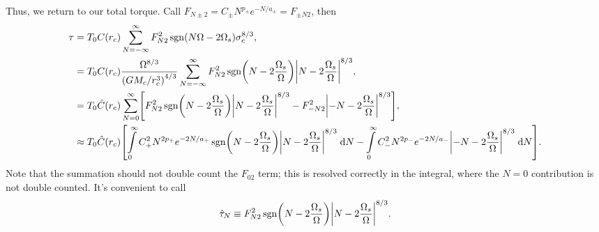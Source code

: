 \documentclass[11pt,
        usenames, %
        dvipsnames %
    ]{article}
\DeclareMathOperator{\sgn}{sgn}
\DeclarePairedDelimiter\abs{\lvert}{\rvert}
\DeclarePairedDelimiter\p{\lparen}{\rparen}
\DeclarePairedDelimiter\s{\lbrack}{\rbrack}
\begin{document}
Thus, we return to our total torque. Call $F_{N \pm 2} = C_{\pm}N^{p_{\pm}}
e^{-N/a_{\pm}} = F_{\pm N 2}$, then
\begin{align}
    \tau &= T_0 C(r_c) \sum\limits_{N = -\infty}^\infty
            F_{N2}^2 \sgn\p*{N\Omega - 2\Omega_s}
                \sigma_c^{8/3},\\
        &= T_0 C(r_c) \frac{\Omega^{8/3}}{\p*{GM_c/r_c^3}^{4/3}}
            \sum\limits_{N = -\infty}^\infty
                F_{N2}^2 \sgn\p*{N - 2\frac{\Omega_s}{\Omega}}
                    \abs*{N - 2\frac{\Omega_s}{\Omega}}^{8/3},\\
        &= T_0 \hat{C}(r_c) \sum\limits_{N = 0}^\infty
            \s*{F_{N2}^2 \sgn\p*{N - 2\frac{\Omega_s}{\Omega}}
                \abs*{N - 2\frac{\Omega_s}{\Omega}}^{8/3} -
                F_{-N2}^2 \abs*{-N - 2\frac{\Omega_s}{\Omega}}^{8/3}},\\
        &\approx T_0\hat{C}(r_c)\s*{
            \int\limits_0^\infty C_+^2N^{2p_{+}} e^{-2N / a_{+}}
                \sgn\p*{N - 2\frac{\Omega_s}{\Omega}}
                \abs*{N - 2\frac{\Omega_s}{\Omega}}^{8/3}\;\mathrm{d}N -
             \int\limits_0^\infty C_-^2N^{2p_{-}} e^{-2N / a_{-}}
                    \abs*{-N - 2\frac{\Omega_s}{\Omega}}^{8/3}\;\mathrm{d}N}.
\end{align}
Note that the summation should not double count the $F_{02}$ term; this is
resolved correctly in the integral, where the $N = 0$ contribution is not double
counted. It's convenient to call
\begin{equation}
    \hat{\tau}_N \equiv F_{N2}^2 \sgn\p*{N - 2\frac{\Omega_s}{\Omega}}
        \abs*{N - 2\frac{\Omega_s}{\Omega}}^{8/3}.
\end{equation}
\end{document}
